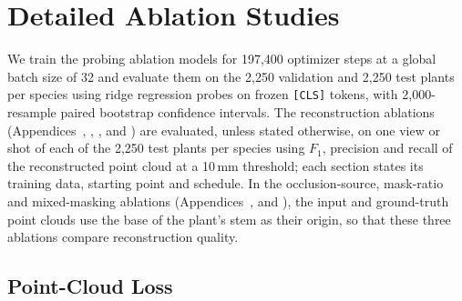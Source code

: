 \documentclass[10pt,twocolumn,letterpaper]{article}
\begin{document}
\section{Detailed Ablation Studies}
\label{app:ablations}


We train the probing ablation models for 197{,}400 optimizer steps at a global batch size of 32 and evaluate them on
the 2{,}250 validation and 2{,}250 test plants per species using ridge regression probes on frozen \texttt{[CLS]}
tokens, with 2{,}000-resample paired bootstrap confidence intervals. The reconstruction ablations
(Appendices~, , ,  and ) are evaluated, unless stated otherwise, on
one view or shot of each of the 2{,}250 test plants per species using $F_1$, precision and recall of the reconstructed point cloud at a 10\,mm
threshold; each section states its training data, starting point and schedule. In the occlusion-source, mask-ratio and
mixed-masking ablations (Appendices~,  and ), the input and ground-truth point clouds use the base of the plant's stem as their origin,
so that these three ablations compare reconstruction quality.

\subsection{Point-Cloud Loss}
\label{sec:abl_loss}
\end{document}
